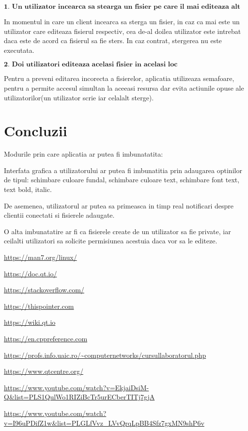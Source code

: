 \documentclass[runningheads]{llncs}
\begin{document}
$\textbf{1. Un utilizator incearca sa stearga un fisier pe care il mai editeaza alt utilizator}$

In momentul in care un client incearca sa sterga un fisier, in caz ca mai este un utilizator care editeaza fisierul respectiv, cea de-al doilea utilizator este intrebat daca este de acord ca fisierul sa fie sters. In caz contrat, stergerea nu este executata.

$\textbf{2. Doi utilizatori editeaza acelasi fisier in acelasi loc}$

Pentru a preveni editarea incorecta a fisierelor, aplicatia utilizeaza semafoare, pentru a permite accesul simultan la aceeasi resursa dar evita actiunile opuse ale utilizatorilor(un utilizator scrie iar celalalt sterge).




\section{Concluzii}

Modurile prin care aplicatia ar putea fi imbunatatita:

Interfata grafica a utilizatorului ar putea fi imbunatitia prin adaugarea optinilor de tipul: schimbare culoare fundal, schimbare culoare text, schimbare font text, text bold, italic.

De asemenea, utilizatorul ar putea sa primeasca in timp real notificari despre clientii conectati si fisierele adaugate.

O alta imbunatatire ar fi ca fisierele create de un utilizator sa fie private, iar ceilalti utilizatori sa solicite permisiunea acestuia daca vor sa le editeze.




\begin{thebibliography}{8}
\url{https://man7.org/linux/}

\url{https://doc.qt.io/}

\url{https://stackoverflow.com/}

\url{https://thispointer.com}

\url{https://wiki.qt.io}

\url{https://en.cppreference.com}

\url{https://profs.info.uaic.ro/~computernetworks/cursullaboratorul.php}

\url{https://www.qtcentre.org/}

\url{https://www.youtube.com/watch?v=EkjaiDsiM-Q&list=PLS1QulWo1RIZiBcTr5urECberTITj7gjA}

\url{https://www.youtube.com/watch?v=I96uPDifZ1w&list=PLGLfVvz_LVvQrqLpBB4Sfz7gxMN9shP6v}

\end{thebibliography}
\end{document}
